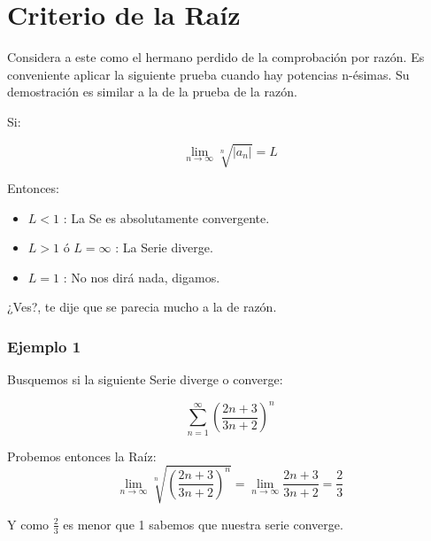\documentclass[12pt]{report}                                %
\begin{document}
    \clearpage
    \section{Criterio de la Raíz}

        Considera a este como el hermano perdido de la comprobación por razón.
        Es conveniente aplicar la siguiente prueba cuando hay potencias n-ésimas.
        Su demostración es similar a la de la prueba de la razón. 

        Si:

        \begin{equation}
            \lim_{n \to \infty} \sqrt[n]{|a_n|} = L
        \end{equation}

        Entonces:
        \begin{itemize}
            \item $L < 1$ : La Se es absolutamente convergente.
            \item $L > 1$ ó $L = \infty$ : La Serie diverge.
            \item $L = 1$ : No nos dirá nada, digamos.
        \end{itemize}

        ¿Ves?, te dije que se parecia mucho a la de razón.

        \subsubsection{Ejemplo 1}
            Busquemos si la siguiente Serie diverge o converge:

            \begin{equation*}
                \sum_{n=1}^{\infty} \left( \frac{2n+3}{3n+2} \right)^n
            \end{equation*}

            Probemos entonces la Raíz:
            \begin{equation*}
                 \lim_{n \to \infty} \sqrt[n]{ \left( \frac{2n+3}{3n+2} \right)^n } =
                 \lim_{n \to \infty} \frac{2n+3}{3n+2} = \frac{2}{3}
            \end{equation*}

            Y como $\frac{2}{3}$ es menor que 1 sabemos que nuestra serie converge.
\end{document}
